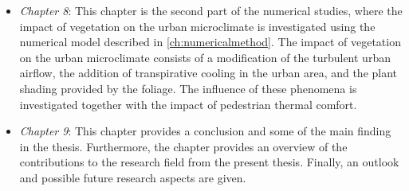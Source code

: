 \begin{itemize}
	\item \textit{Chapter 8}: This chapter is the second part of the numerical studies, where the impact of vegetation on the urban microclimate is investigated using the numerical model described in \cref{ch:numericalmethod}. The impact of vegetation on the urban microclimate consists of a modification of the turbulent urban airflow, the addition of transpirative cooling in the urban area, and the plant shading provided by the foliage. The influence of these phenomena is investigated together with the impact of pedestrian thermal comfort. 

	\item \textit{Chapter 9}: This chapter provides a conclusion and some of the main finding in the thesis. Furthermore, the chapter provides an overview of the contributions to the research field from the present thesis. Finally, an outlook and possible future research aspects are given.
	
\end{itemize}
